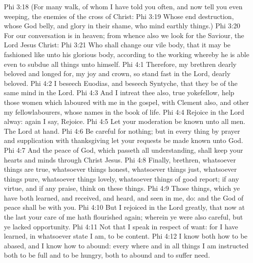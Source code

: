\vs Phi 3:18 (For many walk, of whom I have told you often, and now tell you even weeping,  the enemies of the cross of Christ:
\vs Phi 3:19 Whose end  destruction, whose God  belly, and  glory  in their shame, who mind earthly things.)
\vs Phi 3:20 For our conversation is in heaven; from whence also we look for the Saviour, the Lord Jesus Christ:
\vs Phi 3:21 Who shall change our vile body, that it may be fashioned like unto his glorious body, according to the working whereby he is able even to subdue all things unto himself.
\vs Phi 4:1 Therefore, my brethren dearly beloved and longed for, my joy and crown, so stand fast in the Lord,  dearly beloved.
\vs Phi 4:2 I beseech Euodias, and beseech Syntyche, that they be of the same mind in the Lord.
\vs Phi 4:3 And I intreat thee also, true yokefellow, help those women which laboured with me in the gospel, with Clement also, and  other my fellowlabourers, whose names  in the book of life.
\vs Phi 4:4 Rejoice in the Lord alway:  again I say, Rejoice.
\vs Phi 4:5 Let your moderation be known unto all men. The Lord  at hand.
\vs Phi 4:6 Be careful for nothing; but in every thing by prayer and supplication with thanksgiving let your requests be made known unto God.
\vs Phi 4:7 And the peace of God, which passeth all understanding, shall keep your hearts and minds through Christ Jesus.
\vs Phi 4:8 Finally, brethren, whatsoever things are true, whatsoever things  honest, whatsoever things  just, whatsoever things  pure, whatsoever things  lovely, whatsoever things  of good report; if  any virtue, and if  any praise, think on these things.
\vs Phi 4:9 Those things, which ye have both learned, and received, and heard, and seen in me, do: and the God of peace shall be with you.
\vs Phi 4:10 But I rejoiced in the Lord greatly, that now at the last your care of me hath flourished again; wherein ye were also careful, but ye lacked opportunity.
\vs Phi 4:11 Not that I speak in respect of want: for I have learned, in whatsoever state I am,  to be content.
\vs Phi 4:12 I know both how to be abased, and I know how to abound: every where and in all things I am instructed both to be full and to be hungry, both to abound and to suffer need.
